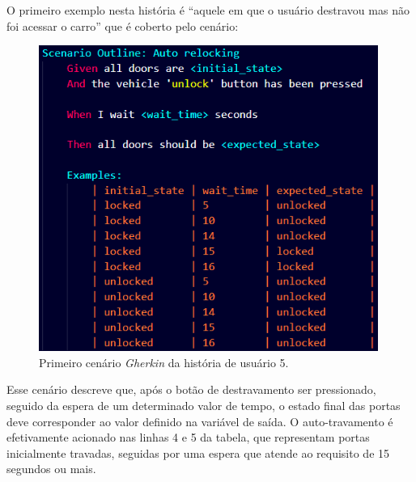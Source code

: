 O primeiro exemplo nesta história é ``aquele em que o usuário destravou mas não foi acessar o carro'' que é coberto pelo cenário:





\begin{figure}[H]
\centering
\includegraphics[height=10cm]{figuras/cenarios/h5c1.png}
\caption{Primeiro cenário \textit{Gherkin} da história de usuário 5.}
\label{fig:h5c1}
\end{figure}

Esse cenário descreve que, após o botão de destravamento ser pressionado, seguido da espera de um determinado valor de tempo, o estado final das 
portas deve corresponder ao valor definido na variável de saída. O auto-travamento é efetivamente acionado nas linhas 4 e 5 da tabela, que representam 
portas inicialmente travadas, seguidas por uma espera que atende ao requisito de 15 segundos ou mais. 

